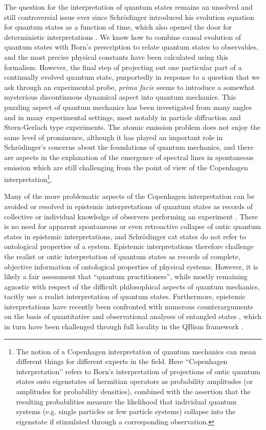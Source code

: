 \documentclass[final,3p,times,twocolumn]{elsarticle3}
\begin{document}
The question for the interpretation of quantum states remains an unsolved
and still controversial issue ever since Schr\"odinger introduced his 
evolution equation for quantum states as a function of time, which also 
opened the door for deterministic interpretations \cite{erwin}. We know 
how to combine causal evolution of quantum states with Born's prescription 
to relate quantum states to observables, and the most precise physical 
constants have been calculated using this formalism.
However, the final step of projecting out one particular part of a continually
evolved quantum state, purportedly in response to a question that we ask
through an experimental probe, {\it prima facie} seems to introduce a somewhat 
mysterious discontinuous dynamical aspect into quantum mechanics.
This puzzling aspect of quantum mechanics has been investigated from many
angles and in many experimental settings, most notably in particle diffraction
and Stern-Gerlach type experiments. The atomic emission problem does
not enjoy the same level of prominence, although it has played an important
role in Schr\"odinger's concerns about the foundations of quantum mechanics,
and there are aspects in the explanation of the emergence of spectral lines
in spontaneous emission which are still challenging from the point of view
of the Copenhagen interpretation\footnote{The notion of
a Copenhagen interpretation of quantum mechanics can mean different things
for different experts in the field. Here ``Copenhagen interpretation''
refers to Born's interpretation of projections of ontic quantum states
onto eigenstates of hermitian operators as probability amplitudes
(or amplitudes for probability densities), combined with the assertion
that the resulting probabilities measure the likelihood that individual
quantum systems (e.g. single particles or few particle systems)
collapse into the eigenstate if stimulated through a corresponding observation.}.

Many of the more problematic aspects of the Copenhagen interpretation can be 
avoided or resolved in epistemic interpretations of quantum states as records 
of collective or individual knowledge of observers performing an 
experiment \cite{fuchs,qb1,ferrero,spekkens}. There is no need for apparent
spontaneous or even retroactive collapse of ontic quantum states in epistemic 
interpretations, and Schr\"odinger cat states do not refer to ontological 
properties of a system. Epistemic interpretations therefore challenge the realist 
or ontic interpretation of quantum states as records of complete, objective 
information of ontological properties of physical systems. However, it is likely 
a fair assessment that ``quantum practitioners'', while mostly remaining agnostic 
with respect of the difficult philosophical aspects of quantum mechanics, tacitly 
use a realist interpretation of quantum states. Furthermore, epistemic 
interpretations have recently been confronted with numerous counterarguments on 
the basis of quantitative and observational analyses of entangled states
\cite{realpsia,realpsi0,realpsi1,realpsi2,realpsi3,realpsi4,realpsi5,realpsi6},
which in turn have been challenged through full locality 
in the QBism framework \cite{qb2}. 
\end{document}
